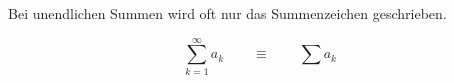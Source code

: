Bei unendlichen Summen wird oft nur das Summenzeichen geschrieben.

$$\sum_{k=1}^\infty a_k \qquad \equiv \qquad \sum a_k$$